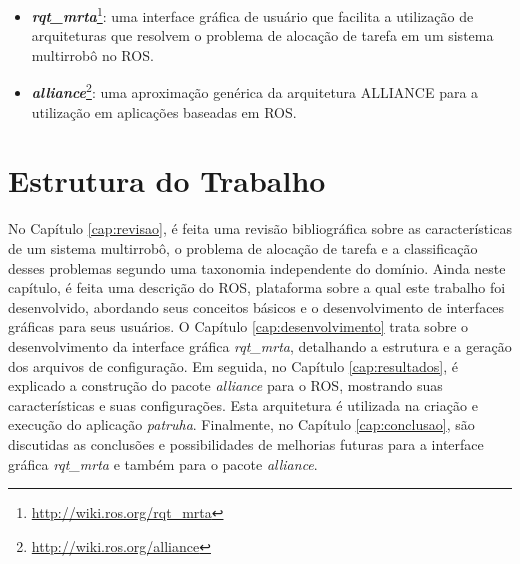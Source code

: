         \begin{itemize}
            \item \textbf{\textit{rqt\_mrta}}\footnote{\url{http://wiki.ros.org/rqt_mrta}}: uma interface gráfica de usuário que facilita a utilização de arquiteturas que resolvem o problema de alocação de tarefa em um sistema multirrobô no ROS.
            \item \textbf{\textit{alliance}}\footnote{\url{http://wiki.ros.org/alliance}}: uma aproximação genérica da arquitetura ALLIANCE para a utilização em aplicações baseadas em ROS.
        \end{itemize}
    
    \section{Estrutura do Trabalho} \label{sec:estrutura}
        No Capítulo \ref{cap:revisao}, é feita uma revisão bibliográfica sobre as características de um sistema multirrobô, o problema de alocação de tarefa e a classificação desses problemas segundo uma taxonomia independente do domínio. Ainda neste capítulo, é feita uma descrição do ROS, plataforma sobre a qual este trabalho foi desenvolvido, abordando seus conceitos básicos e o desenvolvimento de interfaces gráficas para seus usuários. O Capítulo \ref{cap:desenvolvimento} trata sobre o desenvolvimento da interface gráfica \textit{rqt\_mrta}, detalhando a estrutura e a geração dos arquivos de configuração. Em seguida, no Capítulo \ref{cap:resultados}, é explicado a construção do pacote \textit{alliance} para o ROS, mostrando suas características e suas configurações. Esta arquitetura é utilizada na criação e execução do aplicação \textit{patruha}. Finalmente, no Capítulo \ref{cap:conclusao}, são discutidas as conclusões e possibilidades de melhorias futuras para a interface gráfica \textit{rqt\_mrta} e também para o pacote \textit{alliance}. %